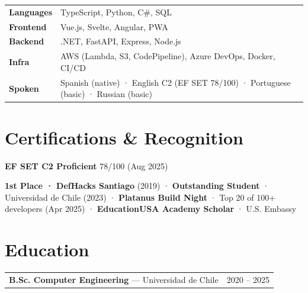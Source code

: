 \documentclass[9.5pt, a4paper]{article}
\makeatletter
\newcommand{\edu}[3]{%
  \noindent
  \begin{tabularx}{\linewidth}{@{}X r@{}}
    \textbf{#1} — #2 & \textcolor{muted}{\small #3}\\
  \end{tabularx}
}
\makeatother
\begin{document}
\begin{tabularx}{\linewidth}{@{} l X @{}}
  \textbf{Languages}  & TypeScript, Python, C\#, SQL \\[0.12em]
  \textbf{Frontend}   & Vue.js, Svelte, Angular, PWA \\[0.12em]
  \textbf{Backend}    & .NET, FastAPI, Express, Node.js \\[0.12em]
  \textbf{Infra}      & AWS (Lambda, S3, CodePipeline), Azure DevOps, Docker, CI/CD \\[0.12em]
  \textbf{Spoken}     & Spanish (native) · English C2 (EF SET 78/100) · Portuguese (basic) · Russian (basic) \\
\end{tabularx}

\section{Certifications \& Recognition}

{\small
\textbf{EF SET C2 Proficient} 78/100 (Aug 2025)

\textbf{1st Place · DefHacks Santiago} (2019)
\enspace\textcolor{muted}{·}\enspace
\textbf{Outstanding Student} · Universidad de Chile (2023)
\enspace\textcolor{muted}{·}\enspace
\textbf{Platanus Build Night} · Top 20 of 100+ developers (Apr 2025)
\enspace\textcolor{muted}{·}\enspace
\textbf{EducationUSA Academy Scholar} · U.S. Embassy
}

\section{Education}

\edu{B.Sc. Computer Engineering}{Universidad de Chile}{2020 – 2025}
\end{document}
